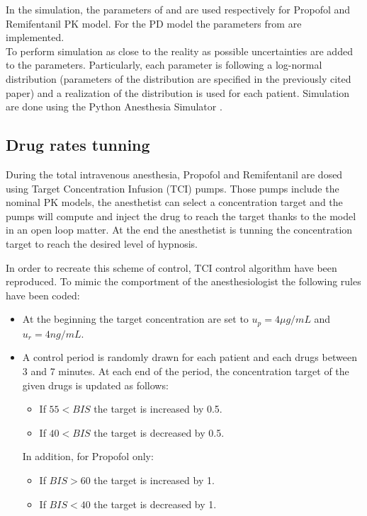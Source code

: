 In the simulation, the parameters of \cite{eleveldPharmacokineticPharmacodynamicModel2018} and \cite{eleveldAllometricModelRemifentanil2017} are used respectively for Propofol and Remifentanil PK model. For the PD model the parameters from \cite{bouillonPharmacodynamicInteractionPropofol2004} are implemented. \\
To perform simulation as close to the reality as possible uncertainties are added to the parameters. Particularly, each parameter is following a log-normal distribution (parameters of the distribution are specified in the previously cited paper) and a realization of the distribution is used for each patient. Simulation are done using the Python Anesthesia Simulator \cite{aubouin-pairaultPASPythonAnesthesia2023}.

\subsection{Drug rates tunning}

During the total intravenous anesthesia, Propofol and Remifentanil are dosed using Target Concentration Infusion (TCI) pumps. Those pumps include the nominal PK models, the anesthetist can select a concentration target and the pumps will compute and inject the drug to reach the target thanks to the model in an open loop matter. At the end the anesthetist is tunning the concentration target to reach the desired level of hypnosis.
\medskip


In order to recreate this scheme of control, TCI control algorithm \cite{shaferAlgorithmsRapidlyAchieve1992} have been reproduced. To mimic the comportment of the anesthesiologist the following rules have been coded:
\begin{itemize}
\item At the beginning the target concentration are set to $u_p = 4 \mu g/mL$ and $u_r = 4 ng/mL$.
\item A control period is randomly drawn for each patient and each drugs between 3 and 7 minutes. At each end of the period, the concentration target of the given drugs is updated as follows:
\begin{itemize}
	\item If $55<BIS$ the target is increased by 0.5.
	\item If $40<BIS$ the target is decreased by 0.5.
\end{itemize}
In addition, for Propofol only:
\begin{itemize}
	\item If $BIS>60$ the target is increased by 1.
	\item If $BIS<40$ the target is decreased by 1.
\end{itemize}
\end{itemize}

